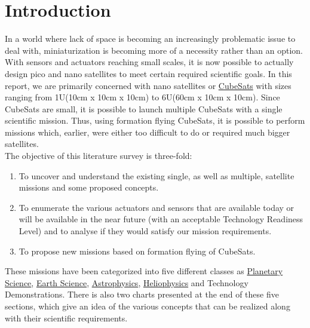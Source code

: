 \section{Introduction}
In a world where lack of space is becoming an increasingly problematic issue to deal with, miniaturization is becoming more of  a necessity rather than an option. With sensors and actuators reaching small scales, it is now possible to actually design pico and nano satellites to meet certain required scientific goals. In this report, we are primarily concerned with nano satellites or \href{http://www.cubesat.org/images/developers/cds_rev12.pdf}{CubeSats} with sizes ranging from 1U(10cm x 10cm x 10cm) to 6U(60cm x 10cm x 10cm). Since CubeSats are small, it is possible to launch multiple CubeSats with a single scientific mission. Thus, using formation flying CubeSats, it is possible to perform missions which, earlier, were either too difficult to do or required much bigger satellites. \\

The objective of this literature survey is three-fold: 
\begin{enumerate}
\item To uncover and understand the existing single, as well as multiple, satellite missions and some proposed concepts.
\item To enumerate the various actuators and sensors that are available today or will be available in the near future (with an acceptable Technology Readiness Level) and to analyse if they would satisfy our mission requirements. 
\item To propose new missions based on formation flying of CubeSats.
\end{enumerate}


These missions have been categorized into five different classes as \href{http://solarsystem.nasa.gov/multimedia/download-detail.cfm?DL_ID=742}{Planetary Science}, \href{http://www.nap.edu/catalog.php?record_id=11820}{Earth Science}, \href{http://www.nap.edu/catalog.php?record_id=12951}{Astrophysics}, \href{http://www.nap.edu/catalog.php?record_id=13060}{Heliophysics} and Technology Demonstrations. There is also two charts presented at the end of these five sections, which give an idea of the various concepts that can be realized along with their scientific requirements. 
